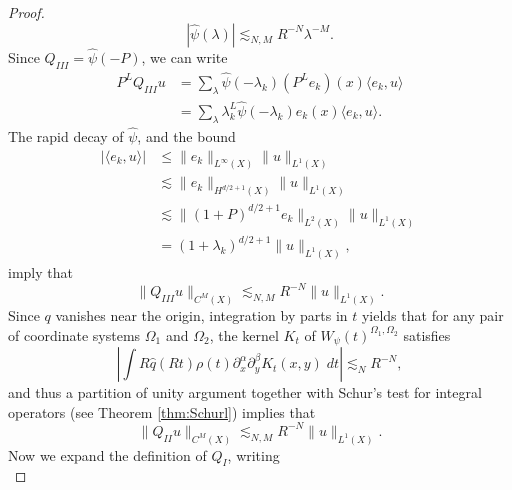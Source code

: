 \begin{proof}
    \begin{equation} \label{psidecaybound}
        |\widehat{\psi}(\lambda)| \lesssim_{N,M} R^{-N} \lambda^{-M}.
    \end{equation}
    Since $Q_{III} = \widehat{\psi}(-P)$, we can write
    \begin{equation}
    \begin{split}
      P^L Q_{III}u &= \sum\nolimits_\lambda \widehat{\psi}(-\lambda_k) (P^L e_k)(x) \langle e_k, u \rangle\\
      &= \sum\nolimits_\lambda \lambda_k^L \widehat{\psi}(-\lambda_k) e_k(x) \langle e_k, u \rangle.
      \end{split}
      \end{equation}
    The rapid decay of $\widehat{\psi}$, and the bound
    \begin{equation}
    \begin{split}
      |\langle e_k, u \rangle| &\leq \| e_k \|_{L^\infty(X)} \| u \|_{L^1(X)}\\
      &\lesssim \| e_k \|_{H^{d/2 + 1}(X)} \| u \|_{L^1(X)}\\
      &\lesssim \| (1 + P)^{d/2 + 1} e_k \|_{L^2(X)} \| u \|_{L^1(X)}\\
      &= (1 + \lambda_k)^{d/2 + 1} \| u \|_{L^1(X)},
    \end{split}
    \end{equation}
    imply that
    \begin{equation} \label{QThreeBound}
        \| Q_{III} u \|_{C^M(X)} \lesssim_{N,M} R^{-N} \| u \|_{L^1(X)}.
    \end{equation}
    Since $q$ vanishes near the origin, integration by parts in $t$ yields that for any pair of coordinate systems $\Omega_1$ and $\Omega_2$, the kernel $K_t$ of $W_\psi(t)^{\Omega_1,\Omega_2}$ satisfies
    \begin{equation}
        \left| \int R \widehat{q}(Rt) \rho(t) \partial_x^\alpha \partial_y^\beta K_t(x,y)\; dt \right| \lesssim_N R^{-N},
    \end{equation}
    and thus a partition of unity argument together with Schur's test for integral operators (see Theorem \ref{thm:Schurl}) implies that
    \begin{equation} \label{QTwoBound}
        \| Q_{II} u \|_{C^M(X)} \lesssim_{N,M} R^{-N} \| u \|_{L^1(X)}.
    \end{equation}
    Now we expand the definition of $Q_I$, writing
    \begin{equation}

\end{equation}
\end{proof}
